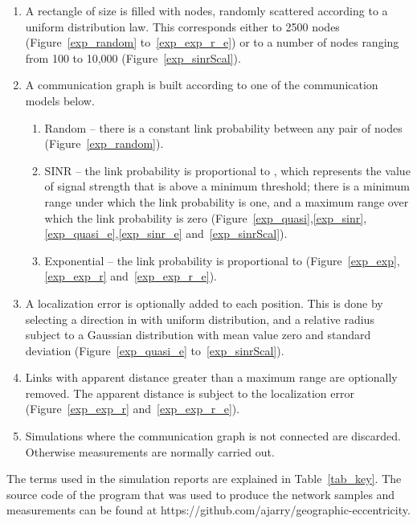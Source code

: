 \documentclass{article}
\begin{document}
\begin{enumerate}
\item A rectangle of size  is filled with  nodes, randomly scattered according to a uniform distribution law. This corresponds either to 2500 nodes (Figure~\ref{exp_random} to~\ref{exp_exp_r_e}) or to a number of nodes ranging from 100 to 10,000 (Figure~\ref{exp_sinrScal}).
\item A communication graph is built according to one of the communication models below.
  \begin{enumerate}
  \item Random -- there is a constant link probability  between any pair of nodes (Figure~\ref{exp_random}).
  \item SINR -- the link probability is proportional to , which represents the value of signal strength that is above a minimum threshold; there is a minimum range  under which the link probability is one, and a maximum range  over which the link probability is zero (Figure~\ref{exp_quasi},\ref{exp_sinr},\ref{exp_quasi_e},\ref{exp_sinr_e} and~\ref{exp_sinrScal}).
  \item Exponential -- the link probability is proportional to  (Figure~\ref{exp_exp},\ref{exp_exp_r} and~\ref{exp_exp_r_e}).
  \end{enumerate}
\item A localization error is optionally added to each position. This is done by selecting a direction in  with uniform distribution, and a relative radius  subject to a Gaussian distribution with mean value zero and standard deviation  (Figure~\ref{exp_quasi_e} to~\ref{exp_sinrScal}).
\item Links with apparent distance greater than a maximum range  are optionally removed. The apparent distance is subject to the localization error (Figure~\ref{exp_exp_r} and~\ref{exp_exp_r_e}).
\item Simulations where the communication graph is not connected are discarded. Otherwise measurements are normally carried out.
\end{enumerate}
The terms used in the simulation reports are explained in Table~\ref{tab_key}. The source code of the program that was used to produce the network samples and measurements can be found at https://github.com/ajarry/geographic-eccentricity.
\end{document}

